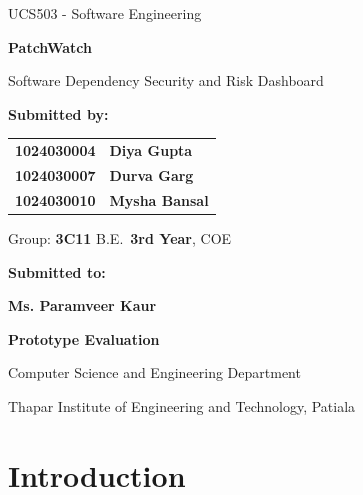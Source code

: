 \documentclass[12pt,a4paper]{report}
\newcommand{\fillin}[1]{\textbf{#1}}
\begin{document}
\begin{titlepage}
  \centering
  \vspace*{1cm}
  {\Large UCS503 - Software Engineering\par}
  \vspace{1.5cm}
  {\Huge\bfseries PatchWatch\par}
  \vspace{0.5cm}
  {\Large Software Dependency Security and Risk Dashboard\par}
  \vspace{2cm}

  {\large\bfseries Submitted by:\par}
  \vspace{0.3cm}
  \begin{tabular}{ll}
    \fillin{1024030004} & \fillin{Diya Gupta} \\
    \fillin{1024030007} & \fillin{Durva Garg} \\
    \fillin{1024030010} & \fillin{Mysha Bansal} \\
  \end{tabular}\par
  \vspace{0.5cm}
  Group: \fillin{3C11} \quad B.E.\ \fillin{3rd Year}, COE\par

  \vspace{1.5cm}
  {\large\bfseries Submitted to:\par}
  \vspace{0.3cm}
  \fillin{Ms. Paramveer Kaur}\par
  \vspace{0.3cm}
  \fillin{Prototype Evaluation}\par

  \vfill
  Computer Science and Engineering Department\par
  Thapar Institute of Engineering and Technology, Patiala
\end{titlepage}

\tableofcontents
\clearpage
{}

\chapter{Introduction}
\end{document}
